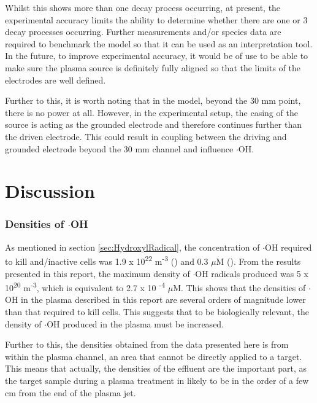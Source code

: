\documentclass[11pt, oneside]{article}   	%
\begin{document}
Whilst this shows more than one decay process occurring, at present, the experimental accuracy limits the ability to determine whether there are one or 3 decay processes occurring.
Further measurements and/or species data are required to benchmark the model so that it can be used as an interpretation tool.
In the future, to improve experimental accuracy, it would be of use to be able to make sure the plasma source is definitely fully aligned so that the limits of the electrodes are well defined.

Further to this, it is worth noting that in the model, beyond the 30 mm point, there is no power at all. However, in the experimental setup, the casing of the source is acting as the grounded electrode and therefore continues further than the driven electrode. This could result in coupling between the driving and grounded electrode beyond the 30 mm channel and influence $\cdot$OH.

\section{Discussion}


\subsubsection{Densities of $\cdot$OH}

As mentioned in section \ref{sec:HydroxylRadical}, the concentration of $\cdot$OH required to kill and/inactive cells was 1.9 x 10\textsuperscript{22} m\textsuperscript{-3} (\cite{Attri2015}) and 0.3 $\mu$M (\cite{Zweier1988}).
From the results presented in this report, the maximum density of $\cdot$OH radicals produced was 5 x 10\textsuperscript{20} m\textsuperscript{-3}, which is equivalent to 2.7 x 10 \textsuperscript{-4} $\mu$M.
This shows that the densities of $\cdot$OH in the plasma described in this report are several orders of magnitude lower than that required to kill cells.
This suggests that to be biologically relevant, the density of $\cdot$OH produced in the plasma must be increased.

Further to this, the densities obtained from the data presented here is from within the plasma channel, an area that cannot be directly applied to a target.
This means that actually, the densities of the effluent are the important part, as the target sample during a plasma treatment in likely to be in the order of a few cm from the end of the plasma jet.
\end{document}
